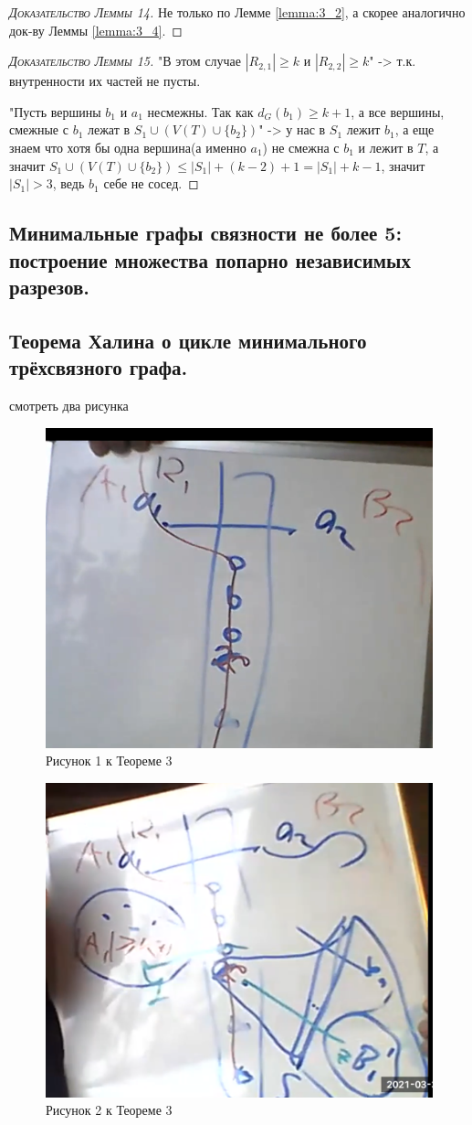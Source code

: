 \begin{proof}[\normalfont\textsc{Доказательство Леммы 14}]
	Не только по Лемме \ref{lemma:3_2}, а скорее аналогично док-ву Леммы \ref{lemma:3_4}.
\end{proof}

\begin{proof}[\normalfont\textsc{Доказательство Леммы 15}]
	"В этом случае $|R_{2, 1}| \geq k$ и $|R_{2, 2}| \geq k$" -> т.к. внутренности их частей не пусты.

	"Пусть вершины $b_1$ и $a_1$ несмежны. Так как $d_G(b_1) \geq k + 1$, а все вершины, смежные с $b_1$ лежат в $S_1 \cup (V(T) \cup \{b_2\})$" -> у нас в $S_1$ лежит $b_1$, а еще знаем что хотя бы одна вершина(а именно $a_1$) не смежна с $b_1$ и лежит в $T$, а значит  $S_1 \cup (V(T) \cup \{b_2\}) \leqslant |S_1| + (k - 2) + 1 = |S_1| + k - 1$, значит $|S_1| > 3$, ведь  $b_1$ себе не сосед.
\end{proof}

\subsection{Минимальные графы связности не более 5: построение множества попарно независимых разрезов.}

\subsection{Теорема Халина о цикле минимального трёхсвязного графа.}

смотреть два рисунка

\begin{figure}[ht]
    \centering
	\includegraphics[width=0.4\columnwidth]{figures/theorem_3_4.png}
    \caption{Рисунок 1 к Теореме 3}
\end{figure}

\begin{figure}[ht]
    \centering
	\includegraphics[width=0.4\columnwidth]{figures/theorem_3_4_2.png}
    \caption{Рисунок 2 к Теореме 3}
\end{figure}
